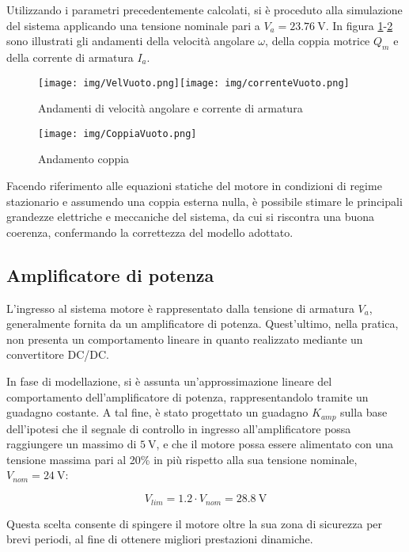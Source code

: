 \documentclass{article}
\begin{document}
Utilizzando i parametri precedentemente calcolati, si è proceduto alla simulazione del sistema applicando una tensione nominale pari a $V_a = 23.76~\text{V}$. In figura \ref{fig:vvel_simulink}-\ref{fig:coppia} sono illustrati gli andamenti della velocità angolare $\omega$, della coppia motrice $Q_m$ e della corrente di armatura $I_a$.

\begin{figure}[h!]
\texttt{[image: img/VelVuoto.png]}\texttt{[image: img/correnteVuoto.png]}
\caption{Andamenti di velocità angolare e corrente di armatura}
\label{fig:vvel_simulink}
\end{figure}
\newpage

\begin{figure}[t!]
\centering
\texttt{[image: img/CoppiaVuoto.png]}
\caption{Andamento coppia}
\label{fig:coppia}
\end{figure}

Facendo riferimento alle equazioni statiche del motore in condizioni di regime stazionario e assumendo una coppia esterna nulla, è possibile stimare le principali grandezze elettriche e meccaniche del sistema, da cui si riscontra una buona coerenza, confermando la correttezza del modello adottato.


\subsection{Amplificatore di potenza}
L'ingresso al sistema motore è rappresentato dalla tensione di armatura $V_a$, generalmente fornita da un amplificatore di potenza. Quest'ultimo, nella pratica, non presenta un comportamento lineare in quanto realizzato mediante un convertitore DC/DC.

In fase di modellazione, si è assunta un'approssimazione lineare del comportamento dell’amplificatore di potenza, rappresentandolo tramite un guadagno costante. A tal fine, è stato progettato un guadagno $K_{amp}$ sulla base dell'ipotesi che il segnale di controllo in ingresso all’amplificatore possa raggiungere un massimo di $5~\text{V}$, e che il motore possa essere alimentato con una tensione massima pari al 20\% in più rispetto alla sua tensione nominale, $V_{nom} = 24~\text{V}$:

\[
V_{lim} = 1.2\cdot V_{nom} = 28.8~\text{V}
\]

Questa scelta consente di spingere il motore oltre la sua zona di sicurezza per brevi periodi, al fine di ottenere migliori prestazioni dinamiche.
\end{document}

